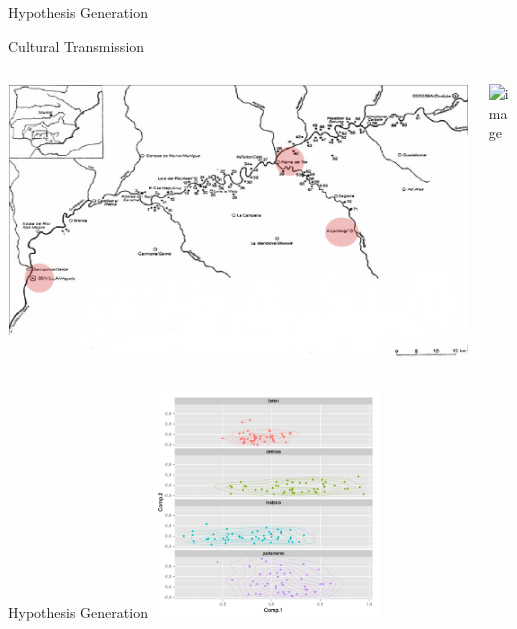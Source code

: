 \documentclass[12pt, notes=show]{beamer}
\begin{document}
\begin{frame}{Hypothesis Generation}
\end{frame}



\begin{frame}{Cultural Transmission}
    \begin{columns}
	\begin{column}{.6\textwidth}
	    \includegraphics[width=.9\textwidth]{images/Beti.png}
	\end{column}
	\begin{column}{.3\textwidth}
	     \includegraphics<2->[width=.9\textwidth]{images/mesures.png}
	\end{column}
    \end{columns}

\end{frame}


\begin{frame}{Hypothesis Generation}
	\includegraphics[height=6cm]{images/pca.png}
\end{frame}
\end{document}
